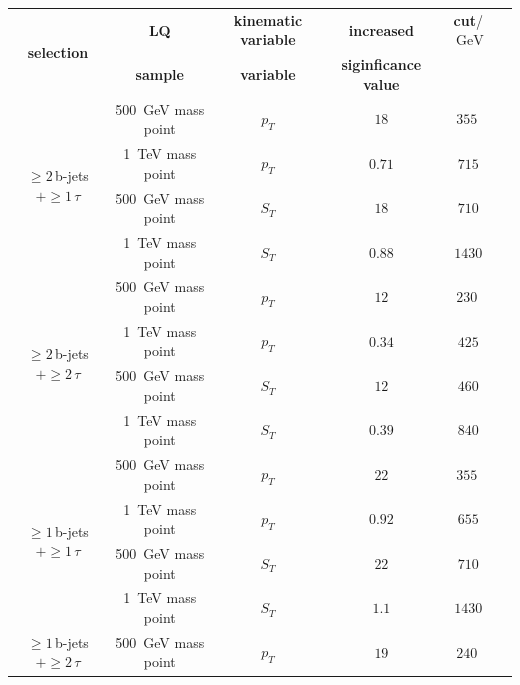 	\begin{table}[htbp]
		\centering
                \footnotesize
                \renewcommand{\arraystretch}{1.2}
		\begin{tabular*}{\linewidth}{@{\extracolsep{\fill}}cccccc}
		\hline
		\hline
		\multirow{2}{*}{\textbf{selection}}  & \textbf{LQ}  & \textbf{kinematic variable}  & \textbf{increased}      & \textbf{cut}/$\SI{}{\giga\electronvolt}$ 
		\\
                &\textbf{sample}&\textbf{variable}&\textbf{siginficance value}
                \\
		\hline
		\multirow{4}{*}{$\geq 2\,$b-jets $+\geq 1\,\tau$} &\SI{500}{\giga\electronvolt} mass point  & $p_T$      & $18$      & $\SI{355}{}$
		\\
                &\SI{1}{\tera\electronvolt} mass point  &       $p_T$   & $0.71$        & $715$
                \\
                &\SI{500}{\giga\electronvolt} mass point  &       $S_T$   & $18$        & $710$
                \\
                &\SI{1}{\tera\electronvolt} mass point  &       $S_T$   & $0.88$        & $1430$
                \\
		\hline
		\multirow{4}{*}{$\geq 2\,$b-jets $+\geq 2\,\tau$} &\SI{500}{\giga\electronvolt} mass point  & $p_T$      & $12$      & $\SI{230}{}$
		\\
                &\SI{1}{\tera\electronvolt} mass point  &       $p_T$   & $0.34$        & $425$
                \\
                &\SI{500}{\giga\electronvolt} mass point  &       $S_T$   & $12$        & $460$
                \\
                &\SI{1}{\tera\electronvolt} mass point  &       $S_T$   & $0.39$        & $840$
                \\
		\hline
                \multirow{4}{*}{$\geq 1\,$b-jets $+\geq 1\,\tau$}&\SI{500}{\giga\electronvolt} mass point   & $p_T$      & $22$      & $\SI{355}{}$
		\\
                &\SI{1}{\tera\electronvolt} mass point  &       $p_T$   & $0.92$        & $655$
                \\
                &\SI{500}{\giga\electronvolt} mass point  &       $S_T$   & $22$        & $710$
                \\
                &\SI{1}{\tera\electronvolt} mass point  &       $S_T$   & $1.1$        & $1430$
                \\
		\hline
                \multirow{4}{*}{$\geq 1\,$b-jets $+\geq 2\,\tau$}&\SI{500}{\giga\electronvolt} mass point   & $p_T$      & $19$      & $\SI{240}{}$

\end{tabular*}
\end{table}
